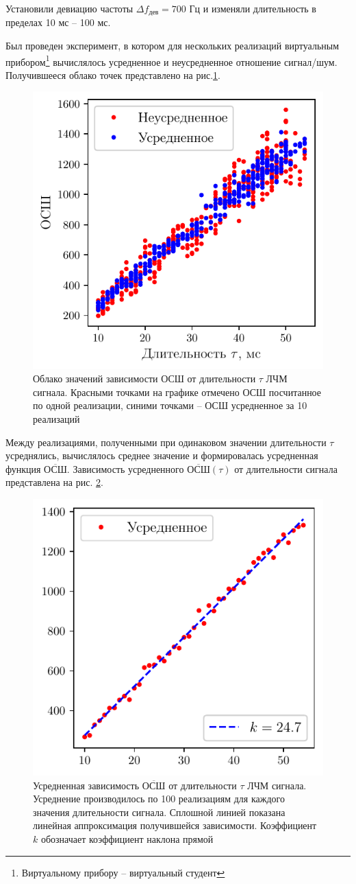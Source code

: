 Установили девиацию частоты $\Delta f_{\text{дев}}= 700$ Гц и изменяли
длительность в пределах 10 мс -- 100 мс. 


Был проведен эксперимент, в котором для нескольких реализаций виртуальным
прибором\footnote{Виртуальному прибору -- виртуальный студент}
вычислялось усредненное и неусредненное отношение сигнал/шум. Получившееся
облако точек представлено на рис.\ref{fig:4.1}.



\begin{figure}[h!]
    \centering
    \includegraphics[width=0.6\linewidth]{imgs/task4/t4f1} 
    \caption{Облако значений зависимости ОСШ от длительности $\tau$ ЛЧМ
    сигнала. Красными точками на графике отмечено ОСШ посчитанное по одной
    реализации, синими точками -- ОСШ усредненное за 10 реализаций }
    \label{fig:4.1}
\end{figure}


\newcommand{\mSNR}{\overline{\text{ОСШ}}}
Между реализациями, полученными при одинаковом значении длительности $\tau$
усреднялись, вычислялось среднее значение и формировалась усредненная функция
$\mSNR$. Зависимость усредненного 
$\mSNR(\tau)$ от длительности сигнала представлена на рис. \ref{fig:4.2}.




\begin{figure}[h!]
    \centering
    \includegraphics[width=0.6\linewidth]{imgs/task4/t4f2}
    \caption{Усредненная зависимость $\mSNR$ от длительности $\tau$ ЛЧМ
        сигнала. Усреднение производилось по 100 реализациям для каждого
        значения длительности сигнала.  Сплошной линией показана линейная
        аппроксимация получившейся зависимости. Коэффициент $k$ обозначает
        коэффициент наклона прямой}
    \label{fig:4.2}
\end{figure}

